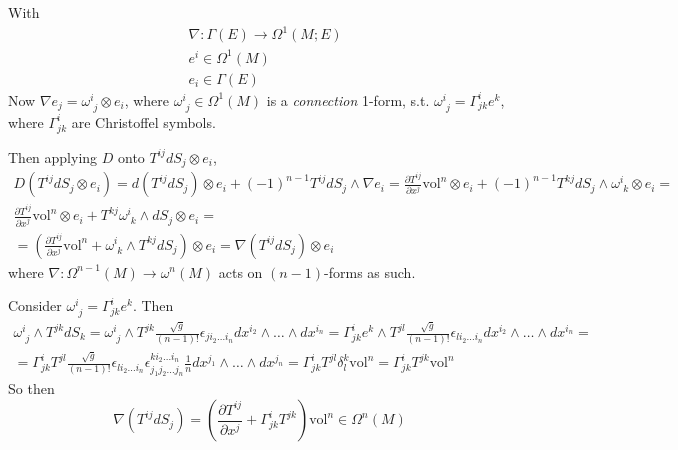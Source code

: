 \documentclass[twoside,landscape,10pt]{amsart}
\theoremstyle{plain}
\theoremstyle{definition}
\theoremstyle{remark}
\begin{document}
\begin{multicols*}{2}
With
\[
\begin{aligned}
  & \nabla : \Gamma(E) \to \Omega^1(M;E) \\ 
  & e^i \in \Omega^1(M) \\ 
  & e_i \in \Gamma(E) 
\end{aligned}
\]
Now $\nabla e_j = \omega^i_{ \,\, j} \otimes e_i$, where $\omega^i_{\,\,j} \in \Omega^1(M)$ is a \emph{connection} 1-form, s.t. $\omega^i_{\,\,j} = \Gamma^i_{jk} e^k$, where $\Gamma^i_{jk}$ are Christoffel symbols.  

Then applying $D$ onto $T^{ij}dS_j \otimes e_i$,
\[
\begin{gathered}
  D(T^{ij}dS_j\otimes e_i) = d(T^{ij}dS_j)\otimes e_i +(-1)^{n-1} T^{ij} dS_j \wedge \nabla e_i = \frac{ \partial T^{ij}}{ \partial x^j} \text{vol}^n \otimes e_i + (-1)^{n-1} T^{kj} dS_j \wedge \omega^i_{\,\,k} \otimes e_i =  \\
\frac{ \partial T^{ij}}{ \partial x^j} \text{vol}^n \otimes e_i + T^{kj} \omega^i_{\,\,k} \wedge dS_j \otimes e_i = \\
= \left( \frac{ \partial T^{ij}}{ \partial x^j} \text{vol}^n + \omega^i_{\,\,k} \wedge T^{kj}dS_j \right) \otimes e_i = \nabla (T^{ij} dS_j) \otimes e_i
\end{gathered}
\]
where $\nabla : \Omega^{n-1}(M) \to \omega^n(M)$ acts on $(n-1)$-forms as such.  

Consider $\omega^i_{\,\,j} = \Gamma^i_{jk} e^k$.  Then
\[
\begin{gathered}
  \omega^i_{\,\,j} \wedge T^{jk}dS_k = \omega^i_{\,\,j} \wedge T^{jk}\frac{ \sqrt{g}}{(n-1)!} \epsilon_{ji_2 \dots i_n} dx^{i_2} \wedge \dots \wedge dx^{i_n} = \Gamma^i_{jk} e^k \wedge T^{jl} \frac{ \sqrt{g}}{(n-1)!} \epsilon_{li_2 \dots i_n} dx^{i_2} \wedge \dots \wedge dx^{i_n} = \\
  = \Gamma^i_{jk} T^{jl} \frac{\sqrt{g}}{ (n-1)!} \epsilon_{li_2 \dots i_n} \epsilon^{ki_2 \dots i_n}_{j_1 j_2 \dots j_n} \frac{1}{n} dx^{j_1} \wedge \dots \wedge dx^{j_n} = \Gamma^i_{jk} T^{jl} \delta_l^k \text{vol}^n =\Gamma^i_{jk} T^{jk}\text{vol}^n
\end{gathered}
\]
So then
\begin{equation}\label{Eq:covariantderT}
\nabla(T^{ij}dS_j) = \left( \frac{ \partial T^{ij}}{ \partial x^j} + \Gamma^i_{jk} T^{jk} \right)\text{vol}^n \in \Omega^n(M)
\end{equation}



\end{multicols*}
\end{document}
